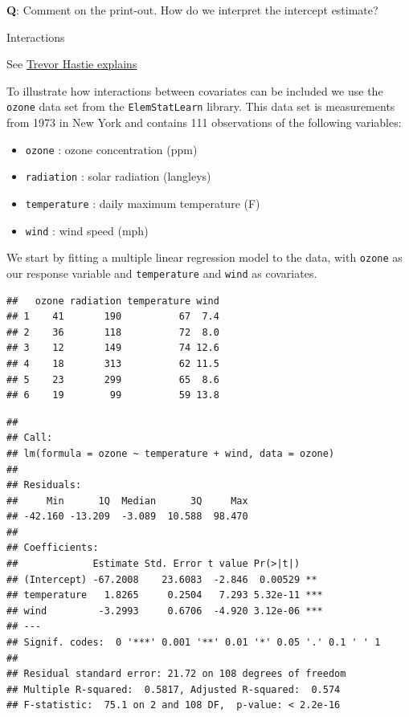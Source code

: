 \documentclass[10pt,ignorenonframetext,]{beamer}
\providecommand{\tightlist}{%
  \setlength{\itemsep}{0pt}\setlength{\parskip}{0pt}}
\begin{document}
\begin{frame}[fragile]
\textbf{Q}: Comment on the print-out. How do we interpret the intercept
estimate?

\end{frame}

\begin{frame}[fragile]

\begin{block}{Interactions}

See
\href{https://www.youtube.com/watch?v=IFzVxLv0TKQ\&list=PL5-da3qGB5IBSSCPANhTgrw82ws7w_or9\&index=5}{Trevor
Hastie explains}

To illustrate how interactions between covariates can be included we use
the \texttt{ozone} data set from the \texttt{ElemStatLearn} library.
This data set is measurements from 1973 in New York and contains 111
observations of the following variables:

\begin{itemize}
\tightlist
\item
  \texttt{ozone} : ozone concentration (ppm)
\item
  \texttt{radiation} : solar radiation (langleys)
\item
  \texttt{temperature} : daily maximum temperature (F)
\item
  \texttt{wind} : wind speed (mph)
\end{itemize}

We start by fitting a multiple linear regression model to the data, with
\texttt{ozone} as our response variable and \texttt{temperature} and
\texttt{wind} as covariates.

\begin{verbatim}
##   ozone radiation temperature wind
## 1    41       190          67  7.4
## 2    36       118          72  8.0
## 3    12       149          74 12.6
## 4    18       313          62 11.5
## 5    23       299          65  8.6
## 6    19        99          59 13.8
\end{verbatim}

\end{block}

\end{frame}

\begin{frame}[fragile]

\small

\begin{verbatim}
## 
## Call:
## lm(formula = ozone ~ temperature + wind, data = ozone)
## 
## Residuals:
##     Min      1Q  Median      3Q     Max 
## -42.160 -13.209  -3.089  10.588  98.470 
## 
## Coefficients:
##             Estimate Std. Error t value Pr(>|t|)    
## (Intercept) -67.2008    23.6083  -2.846  0.00529 ** 
## temperature   1.8265     0.2504   7.293 5.32e-11 ***
## wind         -3.2993     0.6706  -4.920 3.12e-06 ***
## ---
## Signif. codes:  0 '***' 0.001 '**' 0.01 '*' 0.05 '.' 0.1 ' ' 1
## 
## Residual standard error: 21.72 on 108 degrees of freedom
## Multiple R-squared:  0.5817, Adjusted R-squared:  0.574 
## F-statistic:  75.1 on 2 and 108 DF,  p-value: < 2.2e-16
\end{verbatim}

\normalsize

\end{frame}
\end{document}
